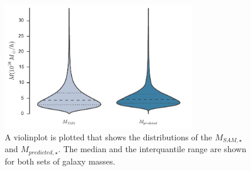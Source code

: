 \documentclass[a4paper,fleqn,usenatbib]{mnras}
\begin{document}
\begin{figure}
  \includegraphics[width=84mm]{fig3.pdf}
  \caption{A violinplot is plotted that shows the distributions of the $M_{SAM,\star}$ and $M_{predicted,\star}$. The median and the interquantile range are shown for both sets of galaxy masses.}
    \label{stellar2}

\end{figure}
\end{document}
